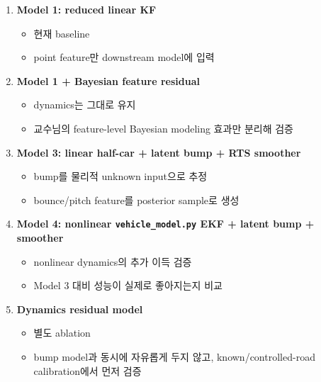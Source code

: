 \documentclass[letterpaper,10pt,journal,twocolumn]{ieeeconf}
\begin{document}
\begin{enumerate}
\def\labelenumi{\arabic{enumi}.}

\item
  \textbf{Model 1: reduced linear KF}

  \begin{itemize}
  
  \item
    현재 baseline
  \item
    point feature만 downstream model에 입력
  \end{itemize}
\item
  \textbf{Model 1 + Bayesian feature residual}

  \begin{itemize}
  
  \item
    dynamics는 그대로 유지
  \item
    교수님의 feature-level Bayesian modeling 효과만 분리해 검증
  \end{itemize}
\item
  \textbf{Model 3: linear half-car + latent bump + RTS smoother}

  \begin{itemize}
  
  \item
    bump를 물리적 unknown input으로 추정
  \item
    bounce/pitch feature를 posterior sample로 생성
  \end{itemize}
\item
  \textbf{Model 4: nonlinear \texttt{vehicle\_model.py} EKF + latent bump + smoother}

  \begin{itemize}
  
  \item
    nonlinear dynamics의 추가 이득 검증
  \item
    Model 3 대비 성능이 실제로 좋아지는지 비교
  \end{itemize}
\item
  \textbf{Dynamics residual model}

  \begin{itemize}
  
  \item
    별도 ablation
  \item
    bump model과 동시에 자유롭게 두지 않고, known/controlled-road calibration에서 먼저 검증
  \end{itemize}
\end{enumerate}
\end{document}
